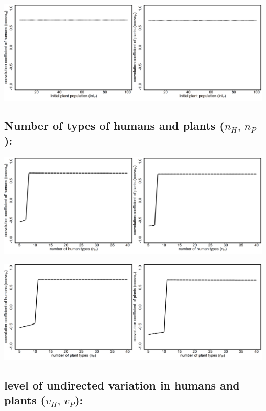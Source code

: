 \documentclass[
]{book}
\begin{document}
\includegraphics[width=1\linewidth]{plots/2_exp_initial_population_plants_bifurcationPlotPair}

\hypertarget{number-of-types-of-humans-and-plants-n_hn_p}{%
\subsection{\texorpdfstring{Number of types of humans and plants (\(n_{H},\,n_{P}\)):}{Number of types of humans and plants (n\_\{H\},\textbackslash,n\_\{P\}):}}\label{number-of-types-of-humans-and-plants-n_hn_p}}

\includegraphics[width=1\linewidth]{plots/2_exp_number_types_humans_bifurcationPlotPair}

\includegraphics[width=1\linewidth]{plots/2_exp_number_types_plants_bifurcationPlotPair}

\hypertarget{level-of-undirected-variation-in-humans-and-plants-v_hv_p}{%
\subsection{\texorpdfstring{level of undirected variation in humans and plants (\(v_{H},\,v_{P}\)):}{level of undirected variation in humans and plants (v\_\{H\},\textbackslash,v\_\{P\}):}}\label{level-of-undirected-variation-in-humans-and-plants-v_hv_p}}
\end{document}
